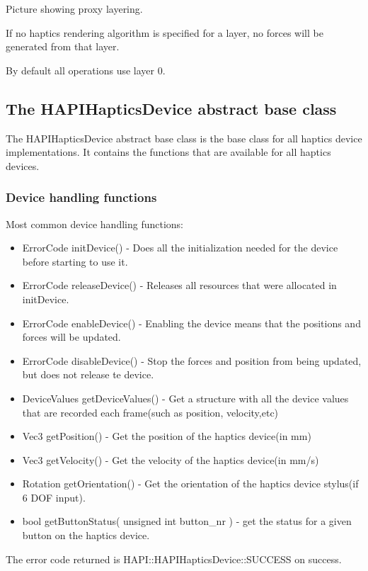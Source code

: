 Picture showing proxy layering.

If no haptics rendering algorithm is specified for a layer, no forces
will be generated from that layer.
 
By default all operations use layer 0.

\subsection{The HAPIHapticsDevice abstract base class}
The HAPIHapticsDevice abstract base class is the base class for all
haptics device implementations. It contains the functions that are
available for all haptics devices.  

\subsubsection{Device handling functions}

Most common device handling functions:

\begin{itemize}
\item ErrorCode initDevice() -  Does all the initialization needed for the
device before starting to use it.
\item ErrorCode releaseDevice() - Releases all resources that were allocated
in initDevice.
\item ErrorCode enableDevice() - Enabling the device means that the
positions and forces will be updated.  
\item ErrorCode disableDevice() - Stop the forces and position
from being updated, but does not release te device.
\item DeviceValues getDeviceValues() - Get a structure with all the
  device values that are recorded each frame(such as position,
  velocity,etc)
\item Vec3 getPosition() - Get the position of the haptics device(in
  mm)
\item Vec3 getVelocity() - Get the velocity of the haptics device(in
  mm/s)
\item Rotation getOrientation() - Get the orientation of the haptics
  device stylus(if 6 DOF input).
\item bool getButtonStatus( unsigned int button\_nr ) - get the status
  for a given button on the haptics device.
\end{itemize}

The error code returned is HAPI::HAPIHapticsDevice::SUCCESS on success.

